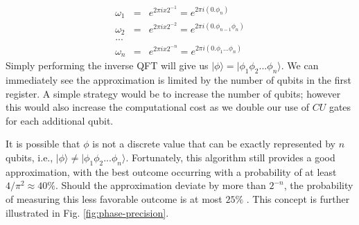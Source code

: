\documentclass[msc,oneside]{ubcthesis}
\begin{document}
	\begin{eqnarray*}
		\omega_1 &=& e^{2\pi i x 2^{-1}} =  e^{2\pi i (0.\phi_n)}\\
		\omega_2 &=& e^{2\pi i x 2^{-2}} =  e^{2\pi i (0.\phi_{n-1}\phi_n)}\\
		...\\
		\omega_n &=& e^{2\pi i x 2^{-n}} =  e^{2\pi i (0.\phi_1...\phi_n)}
	\end{eqnarray*}
	Simply performing the inverse QFT will give us $|\phi\rangle =  |\phi_1\phi_2 ... \phi_n\rangle$.  We can immediately see the approximation is limited by the number of qubits in the first register. A simple strategy would be to increase the number of qubits; however this would also increase the computational cost as we double our use of $CU$ gates for each additional qubit.
	
	It is possible that $\phi$ is not a discrete value that can be exactly represented by $n$ qubits, i.e., $|\phi\rangle \neq |\phi_1\phi_2 ... \phi_n\rangle$. Fortunately, this algorithm still provides a good approximation, with the best outcome occurring with a probability of at least $4/{\pi^2} \approx 40\%$. Should the approximation deviate by more than $2^{-n}$, the probability of measuring this less favorable outcome is at most $25\%$ \cite{Phase-estimation}. This concept is further illustrated in Fig. \ref{fig:phase-precision}.
	
\end{document}
